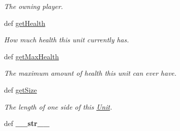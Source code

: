\begin{DoxyCompactItemize}
\begin{DoxyCompactList}\small\item\em The owning player. \item\end{DoxyCompactList}\item 
\hypertarget{classGameObject_1_1Unit_aa2ed517e2aa409e708e05156a00c4e84}{
def \hyperlink{classGameObject_1_1Unit_aa2ed517e2aa409e708e05156a00c4e84}{getHealth}}
\label{classGameObject_1_1Unit_aa2ed517e2aa409e708e05156a00c4e84}

\begin{DoxyCompactList}\small\item\em How much health this unit currently has. \item\end{DoxyCompactList}\item 
\hypertarget{classGameObject_1_1Unit_a566b46c59ff8ceacb70b0c1a639aea26}{
def \hyperlink{classGameObject_1_1Unit_a566b46c59ff8ceacb70b0c1a639aea26}{getMaxHealth}}
\label{classGameObject_1_1Unit_a566b46c59ff8ceacb70b0c1a639aea26}

\begin{DoxyCompactList}\small\item\em The maximum amount of health this unit can ever have. \item\end{DoxyCompactList}\item 
\hypertarget{classGameObject_1_1Unit_aa4947e4f517074ddbf8e65f374f33c7b}{
def \hyperlink{classGameObject_1_1Unit_aa4947e4f517074ddbf8e65f374f33c7b}{getSize}}
\label{classGameObject_1_1Unit_aa4947e4f517074ddbf8e65f374f33c7b}

\begin{DoxyCompactList}\small\item\em The length of one side of this \hyperlink{classGameObject_1_1Unit}{Unit}. \item\end{DoxyCompactList}\item 
\hypertarget{classGameObject_1_1Unit_a80f9fbb90bcfc89ba78500bb3b83b223}{
def {\bfseries \_\-\_\-str\_\-\_\-}}
\label{classGameObject_1_1Unit_a80f9fbb90bcfc89ba78500bb3b83b223}

\end{DoxyCompactItemize}
